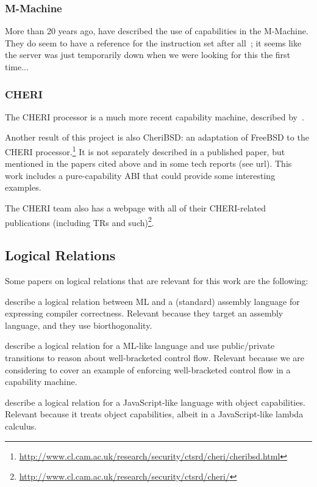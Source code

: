 \documentclass{article}
\begin{document}
\subsubsection{M-Machine}
More than 20 years ago, \cite{Carter:1994:HSF:195473.195579} have described the
use of capabilities in the M-Machine. They do seem to have a reference for the
instruction set after all~\citep{Dally1997Memo59}; it seems like the server was
just temporarily down when we were looking for this the first time...

\subsubsection{CHERI}

The CHERI processor is a much more recent capability machine, described
by~\cite{Woodruff:2014:CCM:2665671.2665740,Watson2015Cheri}.

Another result of this project is also CheriBSD: an adaptation of FreeBSD to the
CHERI
processor.\footnote{\url{http://www.cl.cam.ac.uk/research/security/ctsrd/cheri/cheribsd.html}}
It is not separately described in a published paper, but mentioned in the papers
cited above and in some tech reports (see url). This work includes a
pure-capability ABI that could provide some interesting examples.

The CHERI team also has a webpage with all of their CHERI-related publications
(including TRs and
such)\footnote{\url{http://www.cl.cam.ac.uk/research/security/ctsrd/cheri/}}.

\subsection{Logical Relations}
\label{sec:rw-log-rel}

Some papers on logical relations that are relevant for this work are the
following:

\cite{Hur:2011:KLR:1926385.1926402} describe a logical relation between ML and
a (standard) assembly language for expressing compiler correctness.  Relevant
because they target an assembly language, and they use biorthogonality.

\cite{Dreyer:2010:IHS:1863543.1863566} describe a logical relation for a ML-like
language and use public/private transitions to reason about well-bracketed
control flow. Relevant because we are considering to cover an example of
enforcing well-bracketed control flow in a capability machine.

\cite{Devriese:2016ObjCap} describe a logical relation for a JavaScript-like
language with object capabilities.  Relevant because it treats object
capabilities, albeit in a JavaScript-like lambda calculus.



\end{document}
